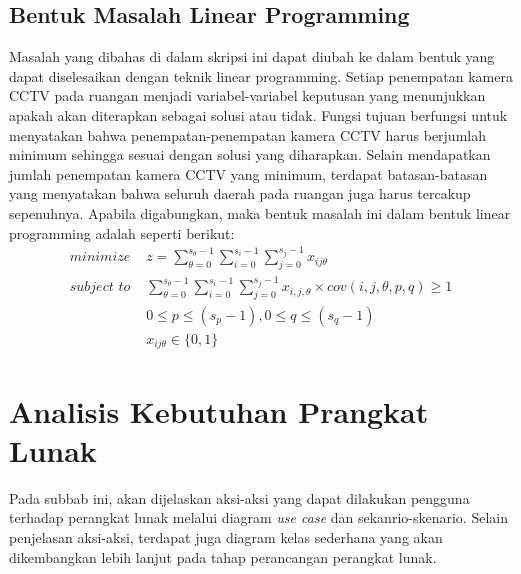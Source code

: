 \subsection{Bentuk Masalah Linear Programming}
Masalah yang dibahas di dalam skripsi ini dapat diubah ke dalam bentuk yang dapat diselesaikan dengan teknik linear programming. Setiap penempatan kamera CCTV pada ruangan menjadi variabel-variabel keputusan yang menunjukkan apakah akan diterapkan sebagai solusi atau tidak. Fungsi tujuan berfungsi untuk menyatakan bahwa penempatan-penempatan kamera CCTV harus berjumlah minimum sehingga sesuai dengan solusi yang diharapkan. Selain mendapatkan jumlah penempatan kamera CCTV yang minimum, terdapat batasan-batasan yang menyatakan bahwa seluruh daerah pada ruangan juga harus tercakup sepenuhnya. Apabila digabungkan, maka bentuk masalah ini dalam bentuk linear programming adalah seperti berikut:
\begin{equation*}
	\begin{split}
		\textit{minimize } & z = \sum_{\theta=0}^{s_{\theta}-1} \sum_{i=0}^{s_i-1} \sum_{j=0}^{s_j-1} x_{ij\theta}\\
		\textit{subject to } & \sum_{\theta=0}^{s_{\theta}-1} \sum_{i=0}^{s_i-1} \sum_{j=0}^{s_j-1} x_{i,j,\theta} \times cov(i,j,\theta,p,q) \geq 1\\
		& 0 \leq p \leq (s_p - 1), 0 \leq q \leq (s_q - 1)\\
		& x_{ij\theta} \in \{0,1\}
	\end{split}
\end{equation*}

\section{Analisis Kebutuhan Prangkat Lunak}
Pada subbab ini, akan dijelaskan aksi-aksi yang dapat dilakukan pengguna terhadap perangkat lunak melalui diagram \textit{use case} dan sekanrio-skenario. Selain penjelasan aksi-aksi, terdapat juga diagram kelas sederhana yang akan dikembangkan lebih lanjut pada tahap perancangan perangkat lunak. 

